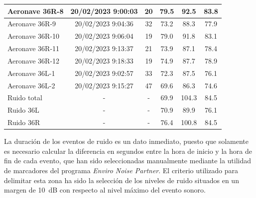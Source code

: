 \documentclass[11pt]{article}
\begin{document}
\begin{table}[htbp]
\begin{tabular}{|l|c|c|c|c|c|}
        \rowcolor[rgb]{ .867,  .922,  .969} Aeronave 36R-8  & 20/02/2023 9:00:03 & 20                 & 79.5                       & 92.5                    & 83.8                      \\ \hline
        \rowcolor[rgb]{ .867,  .922,  .969} Aeronave 36R-9  & 20/02/2023 9:04:36 & 32                 & 73.2                       & 88.3                    & 77.9                      \\ \hline
        \rowcolor[rgb]{ .867,  .922,  .969} Aeronave 36R-10 & 20/02/2023 9:06:04 & 19                 & 79.0                       & 91.8                    & 83.1                      \\ \hline
        \rowcolor[rgb]{ .867,  .922,  .969} Aeronave 36R-11 & 20/02/2023 9:13:37 & 21                 & 73.9                       & 87.1                    & 78.4                      \\ \hline
        \rowcolor[rgb]{ .867,  .922,  .969} Aeronave 36R-12 & 20/02/2023 9:18:33 & 19                 & 74.9                       & 87.7                    & 78.9                      \\ \hline
        \rowcolor[rgb]{ .886,  .937,  .855} Aeronave 36L-1  & 20/02/2023 9:02:57 & 33                 & 72.3                       & 87.5                    & 76.1                      \\ \hline
        \rowcolor[rgb]{ .886,  .937,  .855} Aeronave 36L-2  & 20/02/2023 9:15:27 & 47                 & 69.6                       & 86.3                    & 74.6                      \\ \hline
        Ruido total                                         & -                  & -                  & 69.9                       & 104.3                   & 84.5                      \\ \hline
        Ruido 36L                                           & -                  & -                  & 70.9                       & 89.9                    & 76.1                      \\ \hline
        Ruido 36R                                           & -                  & -                  & 76.4                       & 100.8                   & 84.5                      \\ \hline
    \end{tabular}
    \label{tab:indicadores}
\end{table}

La duración de los eventos de ruido es un dato inmediato, puesto que solamente es necesario calcular la diferencia en segundos entre la hora de inicio y la hora de fin de cada evento, que han sido seleccionadas manualmente mediante la utilidad de marcadores del programa \textit{Enviro Noise Partner}. El criterio utilizado para delimitar esta zona ha sido la selección de los niveles de ruido situados en un margen de \qty{10}{\dB} con respecto al nivel máximo del evento sonoro.
\end{document}
